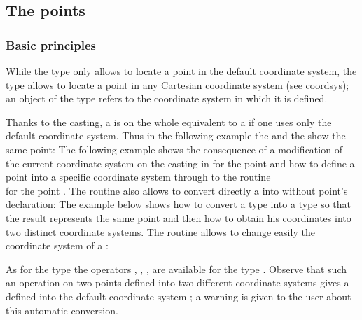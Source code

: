 \documentclass[pdftex]{article}
\begin{document}
\subsection{The points}
\subsubsection{Basic principles}

While the type  only allows to locate a point in the
default coordinate system, the type  allows to locate a point in any
Cartesian coordinate system (see \href{#section.coordsys}{coordsys}); an object
of the type  refers to the coordinate system in which it is defined.

Thanks to the casting, a  is on the whole
 equivalent to a  if one uses only the default coordinate system. Thus
 in the following example the  and the 
 show the same point:
The following example shows the consequence of
a modification of the current coordinate system on the casting   in
 for the point  and how to define a point into a
specific coordinate system through to the routine\\
for the point .
The routine  also allows to
convert directly a  into  without point's declaration:
The example below shows how to convert a type  into a type
 so that the result represents the same point and then how
to obtain his coordinates into  two distinct coordinate systems.
The routine
allows to change easily the coordinate system of a :

As for the type  the operators \code{+}, \code{-},
\code{*}, \code{/} are available for the type . Observe
that such an operation on two points defined into two
different coordinate systems gives a  defined into the default coordinate system
; a warning is given to the user about this
automatic conversion.
\end{document}

